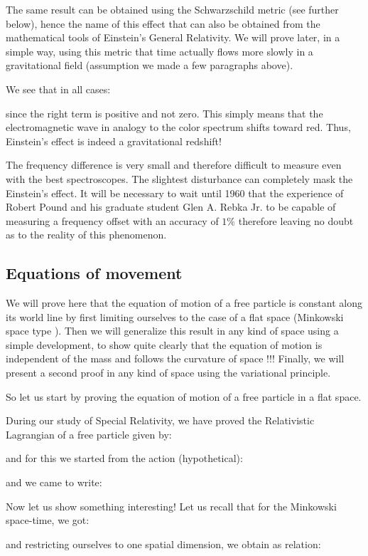 	The same result can be obtained using the Schwarzschild metric (see further below), hence the name of this effect that can also be obtained from the mathematical tools of Einstein's General Relativity. We will prove later, in a simple way, using this metric that time actually flows more slowly in a gravitational field (assumption we made a few paragraphs above).
	
	We see that in all cases:
	
	since the right term is positive and not zero. This simply means that the electromagnetic wave in analogy to the color spectrum shifts toward red. Thus, Einstein's effect is indeed a gravitational redshift!

	The frequency difference is very small and therefore difficult to measure even with the best spectroscopes. The slightest disturbance can completely mask the Einstein's effect. It will be necessary to wait until 1960 that the experience of Robert Pound and his graduate student Glen A. Rebka Jr. to be capable of measuring a frequency offset with an accuracy of $1\%$ therefore leaving no doubt as to the reality of this phenomenon.
	
	\subsection{Equations of movement}
	We will prove here that the equation of motion of a free particle is constant along its world line by first limiting ourselves to the case of a flat space (Minkowski space type ). Then we will generalize this result in any kind of space using a simple development, to show quite clearly that the equation of motion is independent of the mass and follows the curvature of space !!! Finally, we will present a second proof in any kind of space using the variational principle.

	So let us start by proving the equation of motion of a free particle in a flat space.

	During our study of Special Relativity, we have proved the Relativistic Lagrangian of a free particle given by:
	
	and for this we started from the action (hypothetical):
	
	and we came to write:
	
	Now let us show something interesting! Let us recall that for the Minkowski space-time, we got:
	
	and restricting ourselves to one spatial dimension, we obtain as relation:
	
